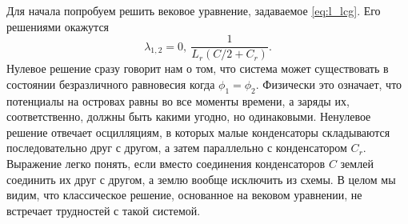 \documentclass[14pt, a4paper]{extreport}
\numberwithin{equation}{section}
\begin{document}
Для начала попробуем решить вековое уравнение, задаваемое \eqref{eq:l_lcg}. Его решениями окажутся
\begin{equation}
	\lambda_{1,2} = 0,\ \frac {1}{L_r \left( C/2 + C_r \right) }.	
\end{equation}
Нулевое решение сразу говорит нам о том, что система может существовать в состоянии безразличного равновесия когда $\phi_1 = \phi_2$. Физически это означает, что потенциалы на островах равны во все моменты времени, а заряды их, соответственно, должны быть какими угодно, но одинаковыми. Ненулевое решение отвечает осцилляциям, в которых малые конденсаторы складываются последовательно друг с другом, а затем параллельно с конденсатором $C_r$. Выражение легко понять, если вместо соединения конденсаторов $C$ землей соединить их друг с другом, а землю вообще исключить из схемы. В целом мы видим, что классическое решение, основанное на вековом уравнении, не встречает трудностей с такой системой.
\end{document}
